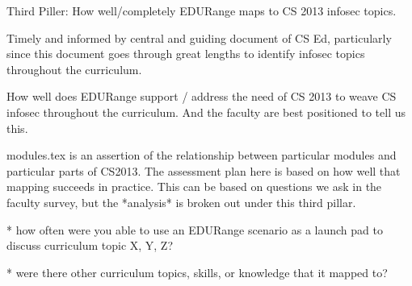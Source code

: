Third Piller: 
 How well/completely EDURange maps to CS 2013 infosec topics.

 Timely and informed by central and guiding document of CS Ed, particularly since this document
 goes through great lengths to identify infosec topics throughout the curriculum.

 How well does EDURange support / address the need of CS 2013 to weave CS infosec throughout
 the curriculum. And the faculty are best positioned to tell us this.

 modules.tex is an assertion of the relationship between particular modules and particular
 parts of CS2013. The assessment plan here is based on how well that mapping succeeds in practice.
 This can be based on questions we ask in the faculty survey, but the *analysis* is broken out
 under this third pillar.

  * how often were you able to use an EDURange scenario as a launch pad to discuss curriculum topic X, Y, Z?

  * were there other curriculum topics, skills, or knowledge that it mapped to?




